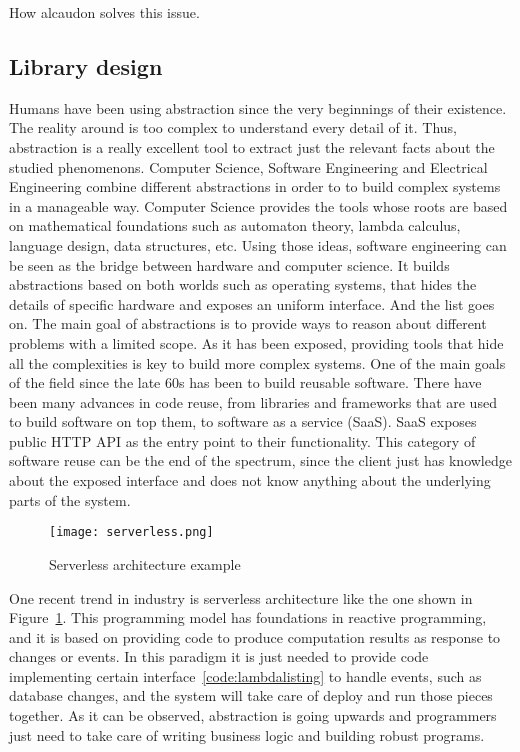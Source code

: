 How alcaudon solves this issue.

\subsection{Library design}

Humans have been using abstraction since the very beginnings of their existence.
The reality around is too complex to understand every detail of it. Thus,
abstraction is a really excellent tool to extract just the relevant facts about
the studied phenomenons. Computer Science, Software Engineering and Electrical
Engineering combine different abstractions in order to to build complex systems
in a manageable way.
Computer Science provides the tools whose roots are based on mathematical
foundations such as automaton theory, lambda calculus, language design, data
structures, etc.
Using those ideas, software engineering can be seen as the bridge between
hardware and computer science. It builds abstractions based on both worlds such
as operating systems, that hides the details of specific hardware and exposes an
uniform interface. And the list goes on. The main goal of abstractions is to
provide ways to reason about different problems with a limited scope.
As it has been exposed, providing tools that hide all the complexities is key to
build more complex systems. One of the main goals of the field since the late
60s has been to build reusable software\cite{reuse}. There have been many
advances in code reuse, from libraries and frameworks that are used to build
software on top them, to software as a service (SaaS). SaaS exposes public HTTP
API as the entry point to their functionality. This category of software reuse
can be the end of the spectrum, since the client just has knowledge about
the exposed interface and does not know anything about the underlying parts of the
system.

\begin{figure}[!h]
\begin{center}
\texttt{[image: serverless.png]}
\caption{Serverless architecture example\cite{awsserverless}}
\label{fig:serverless}
\end{center}
\end{figure}

One recent trend in industry is serverless architecture like the one shown in
Figure~\ref{fig:serverless}. This programming model has foundations in reactive
programming, and it is based on providing code to produce computation results as
response to changes or events. In this paradigm it is just needed to provide
code implementing certain interface~\ref{code:lambdalisting} to handle events,
such as database changes, and the system will take care of deploy and run those
pieces together. As it can be observed, abstraction is going upwards and
programmers just need to take care of writing business logic and building
robust programs.

